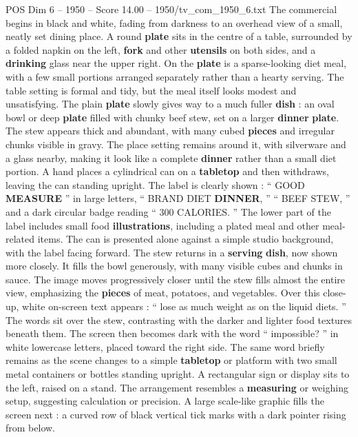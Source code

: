 \begin{textsample}{POS Dim 6 – 1950 – Score 14.00 – 1950/tv\_com\_1950\_6.txt}  \label{ex:f6_pos_008}
The commercial begins in black and white, fading from darkness to an overhead view of a small, neatly set dining place.
A round \textbf{plate} sits in the centre of a table, surrounded by a folded napkin on the left, \textbf{fork} and other \textbf{utensils} on both sides, and a \textbf{drinking} glass near the upper right.
On the \textbf{plate} is a sparse-looking diet meal, with a few small portions arranged separately rather than a hearty serving.
The table setting is formal and tidy, but the meal itself looks modest and unsatisfying.
The plain \textbf{plate} slowly gives way to a much fuller \textbf{dish} : an oval bowl or deep \textbf{plate} filled with chunky beef stew, set on a larger \textbf{dinner} \textbf{plate}.
The stew appears thick and abundant, with many cubed \textbf{pieces} and irregular chunks visible in gravy.
The place setting remains around it, with silverware and a glass nearby, making it look like a complete \textbf{dinner} rather than a small diet portion.
A hand places a cylindrical can on a \textbf{tabletop} and then withdraws, leaving the can standing upright.
The label is clearly shown : “ GOOD \textbf{MEASURE} ” in large letters, “ BRAND DIET \textbf{DINNER}, ” “ BEEF STEW, ” and a dark circular badge reading “ 300 CALORIES. ” The lower part of the label includes small food \textbf{illustrations}, including a plated meal and other meal-related items.
The can is presented alone against a simple studio background, with the label facing forward.
The stew returns in a \textbf{serving} \textbf{dish}, now shown more closely.
It fills the bowl generously, with many visible cubes and chunks in sauce.
The image moves progressively closer until the stew fills almost the entire view, emphasizing the \textbf{pieces} of meat, potatoes, and vegetables.
Over this close-up, white on-screen text appears : “ lose as much weight as on the liquid diets. ” The words sit over the stew, contrasting with the darker and lighter food textures beneath them.
The screen then becomes dark with the word “ impossible? ” in white lowercase letters, placed toward the right side.
The same word briefly remains as the scene changes to a simple \textbf{tabletop} or platform with two small metal containers or bottles standing upright.
A rectangular sign or display sits to the left, raised on a stand.
The arrangement resembles a \textbf{measuring} or weighing setup, suggesting calculation or precision.
A large scale-like graphic fills the screen next : a curved row of black vertical tick marks with a dark pointer rising from below.

\end{textsample}
